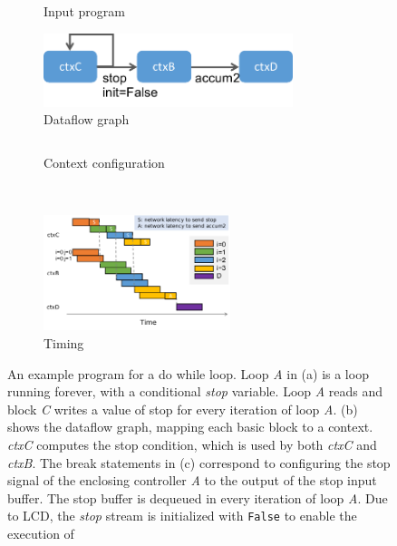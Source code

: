 \begin{figure}
\centering
  \vspace{-1cm}
\begin{subfigure}[b]{0.45\textwidth}
\inputminted{python}{code/dowhile.py}
\caption{Input program}
  \vspace{0.2cm}
\includegraphics[width=0.8\textwidth]{figs/dowhile.pdf}
\caption{Dataflow graph}
\end{subfigure}
\hfill
\begin{subfigure}[b]{0.48\textwidth}
\inputminted{python}{code/dowhilectx.py}
\caption{Context configuration}
\end{subfigure}
\\
  \vspace{0.2cm}
\begin{subfigure}[b]{\textwidth}
  \centering
\includegraphics[width=0.6\textwidth]{figs/dowhiletiming.pdf}
\caption{Timing}
\end{subfigure}
\caption[Do-while loop example]{
  An example program for a do while loop. 
  Loop \emph{A} in (a) is a loop running forever, with a conditional \emph{stop} variable.
Loop \emph{A} reads and block \emph{C} writes a value of stop for every iteration of loop
\emph{A}.
 (b) shows the dataflow graph, mapping each basic block to a context.
\emph{ctxC} computes the stop condition, which is used by both \emph{ctxC} and \emph{ctxB}.
  The break statements in (c) correspond to configuring the stop signal of the enclosing controller \emph{A}
  to the output of the stop input buffer. The stop buffer is dequeued in every iteration of loop \emph{A}.
  Due to LCD,  the \emph{stop} stream is initialized with \texttt{False} to enable the execution of
}
\end{figure}
